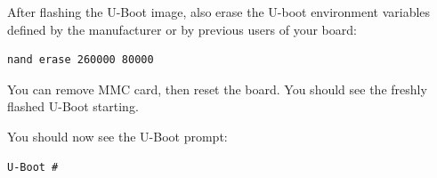 After flashing the U-Boot image, also erase the U-boot environment
variables defined by the manufacturer or by previous users of your
board:

\begin{verbatim}
nand erase 260000 80000
\end{verbatim}

You can remove MMC card, then reset the board. You should see the
freshly flashed U-Boot starting.

You should now see the U-Boot prompt:

\begin{verbatim}
U-Boot #
\end{verbatim}

\clearpage


